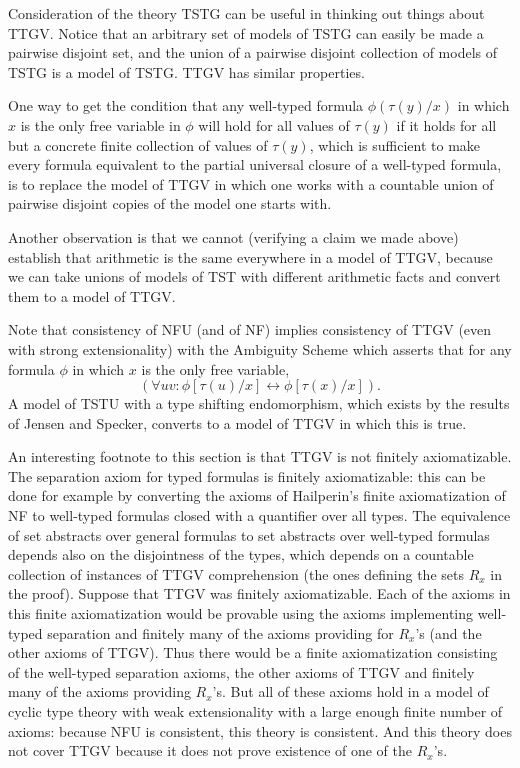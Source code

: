 \documentclass[12pt]{article}
\begin{document}
Consideration of the theory TSTG can be useful in thinking out things about TTGV.  Notice that
an arbitrary set of models of TSTG can easily be made a pairwise disjoint set, and the union of a pairwise disjoint collection of models of TSTG is a model of TSTG.  TTGV has similar properties.

One way to get the condition that any well-typed formula $\phi(\tau(y)/x)$ in which $x$ is the only free variable in $\phi$
will hold for all values of $\tau(y)$ if it holds for all but a concrete finite collection of values of $\tau(y)$, which is sufficient to make every formula equivalent to the partial universal closure of a well-typed formula, is to replace the model of TTGV in which one works with a countable union of pairwise disjoint copies of the model one starts with.

Another observation is that we cannot (verifying a claim we made above) establish that arithmetic is the same everywhere in a model of TTGV, because we can take unions of models of TST with different arithmetic facts and convert them to a model of TTGV.

Note that consistency of NFU (and of NF) implies consistency of TTGV (even with strong extensionality) with the Ambiguity Scheme which asserts that for any  formula $\phi$ in which $x$ is the only free variable, $$(\forall uv:\phi[\tau(u)/x]\leftrightarrow \phi[\tau(x)/x]).$$  A model of TSTU with a type shifting endomorphism, which exists by the results of Jensen and Specker, converts to a model of TTGV in which this is true.

An interesting footnote to this section is that TTGV is not finitely axiomatizable.  The separation axiom for typed formulas is finitely axiomatizable:  this can be done for example by converting the axioms of Hailperin's finite axiomatization of NF to well-typed formulas closed with a quantifier over all types.  The equivalence of set abstracts over general formulas to set abstracts over well-typed formulas depends also on the disjointness of the types, which depends on a countable collection
of instances of TTGV comprehension (the ones defining the sets $R_x$ in the proof).  Suppose that TTGV was finitely axiomatizable.  Each of the axioms in this finite axiomatization would be provable using the axioms implementing well-typed separation and finitely many of the axioms providing for $R_x$'s (and the other axioms of TTGV).  Thus there would be a finite axiomatization consisting of the well-typed separation axioms, the other axioms of TTGV and finitely many of the axioms providing $R_x$'s.  But all of these axioms hold in a model of cyclic type theory with weak extensionality with a large enough finite number of axioms:  because NFU is consistent, this theory is consistent.  And this theory does not cover TTGV because it does not prove existence of one of the $R_x$'s.
\end{document}
